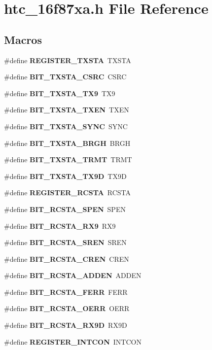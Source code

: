 \section{htc\-\_\-16f87xa.\-h File Reference}
\label{htc__16f87xa_8h}
\subsection*{Macros}
\begin{DoxyCompactItemize}
\item 
\#define {\bf R\-E\-G\-I\-S\-T\-E\-R\-\_\-\-T\-X\-S\-T\-A}~T\-X\-S\-T\-A
\item 
\#define {\bf B\-I\-T\-\_\-\-T\-X\-S\-T\-A\-\_\-\-C\-S\-R\-C}~C\-S\-R\-C
\item 
\#define {\bf B\-I\-T\-\_\-\-T\-X\-S\-T\-A\-\_\-\-T\-X9}~T\-X9
\item 
\#define {\bf B\-I\-T\-\_\-\-T\-X\-S\-T\-A\-\_\-\-T\-X\-E\-N}~T\-X\-E\-N
\item 
\#define {\bf B\-I\-T\-\_\-\-T\-X\-S\-T\-A\-\_\-\-S\-Y\-N\-C}~S\-Y\-N\-C
\item 
\#define {\bf B\-I\-T\-\_\-\-T\-X\-S\-T\-A\-\_\-\-B\-R\-G\-H}~B\-R\-G\-H
\item 
\#define {\bf B\-I\-T\-\_\-\-T\-X\-S\-T\-A\-\_\-\-T\-R\-M\-T}~T\-R\-M\-T
\item 
\#define {\bf B\-I\-T\-\_\-\-T\-X\-S\-T\-A\-\_\-\-T\-X9\-D}~T\-X9\-D
\item 
\#define {\bf R\-E\-G\-I\-S\-T\-E\-R\-\_\-\-R\-C\-S\-T\-A}~R\-C\-S\-T\-A
\item 
\#define {\bf B\-I\-T\-\_\-\-R\-C\-S\-T\-A\-\_\-\-S\-P\-E\-N}~S\-P\-E\-N
\item 
\#define {\bf B\-I\-T\-\_\-\-R\-C\-S\-T\-A\-\_\-\-R\-X9}~R\-X9
\item 
\#define {\bf B\-I\-T\-\_\-\-R\-C\-S\-T\-A\-\_\-\-S\-R\-E\-N}~S\-R\-E\-N
\item 
\#define {\bf B\-I\-T\-\_\-\-R\-C\-S\-T\-A\-\_\-\-C\-R\-E\-N}~C\-R\-E\-N
\item 
\#define {\bf B\-I\-T\-\_\-\-R\-C\-S\-T\-A\-\_\-\-A\-D\-D\-E\-N}~A\-D\-D\-E\-N
\item 
\#define {\bf B\-I\-T\-\_\-\-R\-C\-S\-T\-A\-\_\-\-F\-E\-R\-R}~F\-E\-R\-R
\item 
\#define {\bf B\-I\-T\-\_\-\-R\-C\-S\-T\-A\-\_\-\-O\-E\-R\-R}~O\-E\-R\-R
\item 
\#define {\bf B\-I\-T\-\_\-\-R\-C\-S\-T\-A\-\_\-\-R\-X9\-D}~R\-X9\-D
\item 
\#define {\bf R\-E\-G\-I\-S\-T\-E\-R\-\_\-\-I\-N\-T\-C\-O\-N}~I\-N\-T\-C\-O\-N

\end{DoxyCompactItemize}
